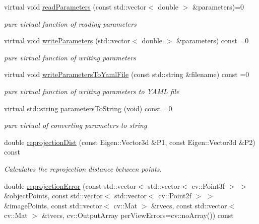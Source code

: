 \begin{DoxyCompactItemize}
virtual void \hyperlink{classcamodocal_1_1Camera_a40f385799b9ab055cf69b720835ad151}{read\+Parameters} (const std\+::vector$<$ double $>$ \&parameters)=0
\begin{DoxyCompactList}\small\item\em pure virtual function of reading parameters \end{DoxyCompactList}\item 
\mbox{\label{classcamodocal_1_1Camera_afb1d6e23e4918c0dd978ef9d3b57a3e2}} 
virtual void \hyperlink{classcamodocal_1_1Camera_afb1d6e23e4918c0dd978ef9d3b57a3e2}{write\+Parameters} (std\+::vector$<$ double $>$ \&parameters) const =0
\begin{DoxyCompactList}\small\item\em pure virtual function of writing parameters \end{DoxyCompactList}\item 
\mbox{\label{classcamodocal_1_1Camera_a8dc590b4552c389a079bb64179ac30d7}} 
virtual void \hyperlink{classcamodocal_1_1Camera_a8dc590b4552c389a079bb64179ac30d7}{write\+Parameters\+To\+Yaml\+File} (const std\+::string \&filename) const =0
\begin{DoxyCompactList}\small\item\em pure virtual function of writing parameters to Y\+A\+ML file \end{DoxyCompactList}\item 
\mbox{\label{classcamodocal_1_1Camera_a151059e8f00d9a5a9c5db19a128937a6}} 
virtual std\+::string \hyperlink{classcamodocal_1_1Camera_a151059e8f00d9a5a9c5db19a128937a6}{parameters\+To\+String} (void) const =0
\begin{DoxyCompactList}\small\item\em pure virtual of converting parameters to string \end{DoxyCompactList}\item 
double \hyperlink{classcamodocal_1_1Camera_a544642f8170212af887350cff67d16b5}{reprojection\+Dist} (const Eigen\+::\+Vector3d \&P1, const Eigen\+::\+Vector3d \&P2) const
\begin{DoxyCompactList}\small\item\em Calculates the reprojection distance between points. \end{DoxyCompactList}\item 
double \hyperlink{classcamodocal_1_1Camera_ab162451505d8b9dfda0b96383d597a16}{reprojection\+Error} (const std\+::vector$<$ std\+::vector$<$ cv\+::\+Point3f $>$ $>$ \&object\+Points, const std\+::vector$<$ std\+::vector$<$ cv\+::\+Point2f $>$ $>$ \&image\+Points, const std\+::vector$<$ cv\+::\+Mat $>$ \&rvecs, const std\+::vector$<$ cv\+::\+Mat $>$ \&tvecs, cv\+::\+Output\+Array per\+View\+Errors=cv\+::no\+Array()) const

\end{DoxyCompactItemize}
